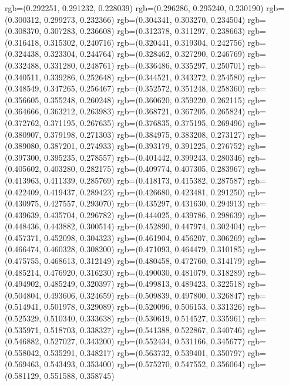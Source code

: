 {{{					rgb=(0.292251, 0.291232, 0.228039)
					rgb=(0.296286, 0.295240, 0.230190)
					rgb=(0.300312, 0.299273, 0.232366)
					rgb=(0.304341, 0.303270, 0.234504)
					rgb=(0.308370, 0.307283, 0.236608)
					rgb=(0.312378, 0.311297, 0.238663)
					rgb=(0.316418, 0.315302, 0.240716)
					rgb=(0.320441, 0.319304, 0.242756)
					rgb=(0.324438, 0.323304, 0.244764)
					rgb=(0.328462, 0.327290, 0.246769)
					rgb=(0.332488, 0.331280, 0.248761)
					rgb=(0.336486, 0.335297, 0.250701)
					rgb=(0.340511, 0.339286, 0.252648)
					rgb=(0.344521, 0.343272, 0.254580)
					rgb=(0.348549, 0.347265, 0.256467)
					rgb=(0.352572, 0.351248, 0.258360)
					rgb=(0.356605, 0.355248, 0.260248)
					rgb=(0.360620, 0.359220, 0.262115)
					rgb=(0.364666, 0.363212, 0.263983)
					rgb=(0.368721, 0.367205, 0.265824)
					rgb=(0.372762, 0.371195, 0.267635)
					rgb=(0.376835, 0.375195, 0.269496)
					rgb=(0.380907, 0.379198, 0.271303)
					rgb=(0.384975, 0.383208, 0.273127)
					rgb=(0.389080, 0.387201, 0.274933)
					rgb=(0.393179, 0.391225, 0.276752)
					rgb=(0.397300, 0.395235, 0.278557)
					rgb=(0.401442, 0.399243, 0.280346)
					rgb=(0.405602, 0.403280, 0.282175)
					rgb=(0.409774, 0.407305, 0.283967)
					rgb=(0.413963, 0.411339, 0.285769)
					rgb=(0.418173, 0.415382, 0.287587)
					rgb=(0.422409, 0.419437, 0.289423)
					rgb=(0.426680, 0.423481, 0.291250)
					rgb=(0.430975, 0.427557, 0.293070)
					rgb=(0.435297, 0.431630, 0.294913)
					rgb=(0.439639, 0.435704, 0.296782)
					rgb=(0.444025, 0.439786, 0.298639)
					rgb=(0.448436, 0.443882, 0.300514)
					rgb=(0.452890, 0.447974, 0.302404)
					rgb=(0.457371, 0.452098, 0.304323)
					rgb=(0.461904, 0.456207, 0.306269)
					rgb=(0.466474, 0.460328, 0.308200)
					rgb=(0.471093, 0.464479, 0.310185)
					rgb=(0.475755, 0.468613, 0.312149)
					rgb=(0.480458, 0.472760, 0.314179)
					rgb=(0.485214, 0.476920, 0.316230)
					rgb=(0.490030, 0.481079, 0.318289)
					rgb=(0.494902, 0.485249, 0.320397)
					rgb=(0.499813, 0.489423, 0.322518)
					rgb=(0.504804, 0.493606, 0.324659)
					rgb=(0.509839, 0.497800, 0.326847)
					rgb=(0.514941, 0.501978, 0.329089)
					rgb=(0.520096, 0.506153, 0.331326)
					rgb=(0.525329, 0.510340, 0.333638)
					rgb=(0.530619, 0.514527, 0.335961)
					rgb=(0.535971, 0.518703, 0.338327)
					rgb=(0.541388, 0.522867, 0.340746)
					rgb=(0.546882, 0.527027, 0.343200)
					rgb=(0.552434, 0.531166, 0.345677)
					rgb=(0.558042, 0.535291, 0.348217)
					rgb=(0.563732, 0.539401, 0.350797)
					rgb=(0.569463, 0.543493, 0.353400)
					rgb=(0.575270, 0.547552, 0.356064)
					rgb=(0.581129, 0.551588, 0.358745)
}}}
